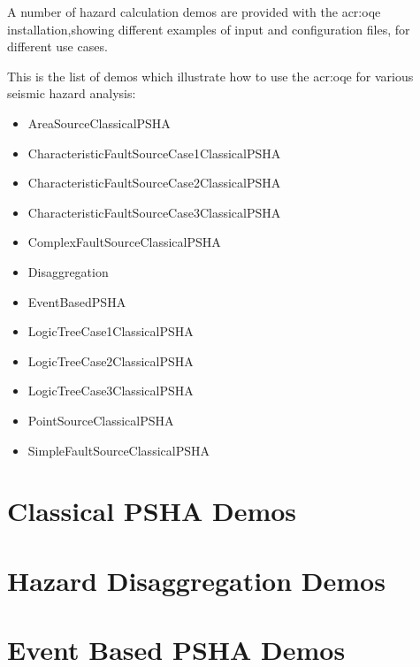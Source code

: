 A number of hazard calculation demos are provided with the \gls{acr:oqe}
installation,showing different examples of input and configuration files,
for different use cases.

This is the list of demos which illustrate how to use the \gls{acr:oqe} for
various seismic hazard analysis:

\begin{itemize}

    \item AreaSourceClassicalPSHA
    \item CharacteristicFaultSourceCase1ClassicalPSHA
    \item CharacteristicFaultSourceCase2ClassicalPSHA
    \item CharacteristicFaultSourceCase3ClassicalPSHA
    \item ComplexFaultSourceClassicalPSHA
    \item Disaggregation
    \item EventBasedPSHA
    \item LogicTreeCase1ClassicalPSHA
    \item LogicTreeCase2ClassicalPSHA
    \item LogicTreeCase3ClassicalPSHA
    \item PointSourceClassicalPSHA
    \item SimpleFaultSourceClassicalPSHA

\end{itemize}

\section{Classical PSHA Demos}
\label{sec:demos_classical_psha}


\section{Hazard Disaggregation Demos}
\label{sec:demos_hazard_disaggregation}


\section{Event Based PSHA Demos}
\label{sec:demos_event_based_psha}


% 
